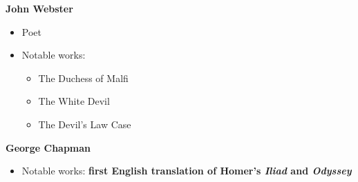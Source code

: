 \documentclass[
  12pt,
    progressbar=frametitle]{beamer}
\providecommand{\tightlist}{%
  \setlength{\itemsep}{0pt}\setlength{\parskip}{0pt}}
\begin{document}
\begin{frame}[allowframebreaks]
\large\textbf{John Webster}\normalsize\vspace{-3mm}

\begin{itemize}
\tightlist
\item
  Poet
\item
  Notable works:

  \begin{itemize}
  \tightlist
  \item
    The Duchess of Malfi
  \item
    The White Devil
  \item
    The Devil's Law Case
  \end{itemize}
\end{itemize}

\large\textbf{George Chapman}\normalsize\vspace{-3mm}

\begin{itemize}
\tightlist
\item
  Notable works: \textbf{first English translation of Homer's
  \emph{Iliad} and \emph{Odyssey}}
\end{itemize}
\end{frame}
\end{document}
